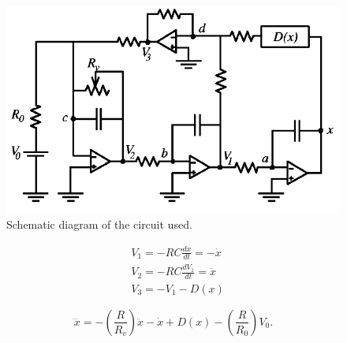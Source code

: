 \begin{minipage}{0.60\textwidth}
    \begin{figure}[h]
    \centering
    \includegraphics[width=1\textwidth]{images/e_chaotic_circuit.png}
    \caption{Schematic diagram of the circuit used.}
\end{figure}
\end{minipage}
\hfill
\begin{minipage}{0.35\textwidth}
    \begin{align*}
        &V_1 = - R C \frac{d x}{d t} = - \dot{x} \\
        &V_2 = - R C \frac{d V_1}{d t} = \ddot{x} \\
        &V_3 = - V_1 - D(x)
    \end{align*}
\end{minipage}
\begin{equation}
        \dddot{x} = - \left(\frac{R}{R_v}\right) \ddot{x} - \dot{x} + D(x) - \left(\frac{R}{R_0}\right)V_0.
\end{equation}
